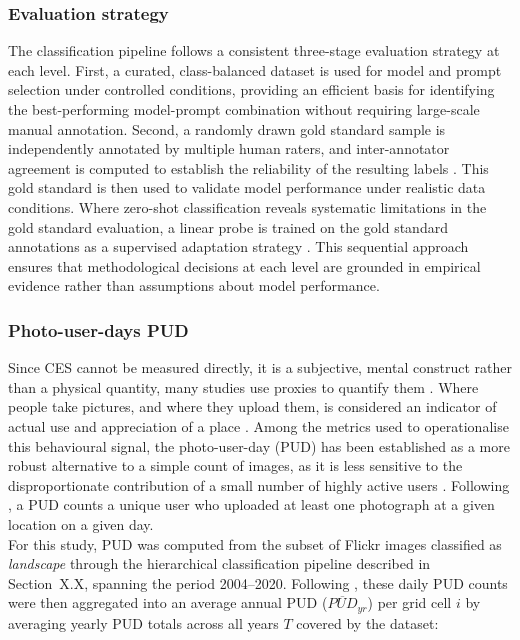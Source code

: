 \documentclass[hidelinks, 11pt]{article}
\begin{document}
\subsubsection{Evaluation strategy}
The classification pipeline follows a consistent three-stage evaluation strategy at each level. First, a curated, class-balanced dataset is used for model and prompt selection under controlled conditions, providing an efficient basis for identifying the best-performing model-prompt combination without requiring large-scale manual annotation. Second, a randomly drawn gold standard sample is independently annotated by multiple human raters, and inter-annotator agreement is computed to establish the reliability of the resulting labels \citep{artstein_survey_2008}. This gold standard is then used to validate model performance under realistic data conditions. Where zero-shot classification reveals systematic limitations in the gold standard evaluation, a linear probe is trained on the gold standard annotations as a supervised adaptation strategy \citep{radford_learning_2021}. This sequential approach ensures that methodological decisions at each level are grounded in empirical evidence rather than assumptions about model performance.

\subsubsection{Photo-user-days PUD}
Since CES cannot be measured directly, it is a subjective, mental construct rather than a physical quantity, many studies use proxies to quantify them \citep{wood_using_2013,ghermandi_geolocated_2022,liao_mapping_2025}. Where people take pictures, and where they upload them, is considered an indicator of actual use and appreciation of a place
\citep{wood_using_2013,ghermandi_geolocated_2022}. Among the metrics used to operationalise this behavioural signal, the photo-user-day (PUD) has
been established as a more robust alternative to a simple count of images, as it is less sensitive to the disproportionate contribution of a small number of highly active users \citep{wood_using_2013}. Following \citet{wood_using_2013}, a PUD counts a unique user who uploaded at least one photograph at a given location on a given day.
\\
For this study, PUD was computed from the subset of Flickr images
classified as \textit{landscape} through the hierarchical classification
pipeline described in Section~X.X, spanning the period 2004--2020.
Following \citet{liao_mapping_2025}, these daily PUD counts were then
aggregated into an average annual PUD ($\overline{PUD}_{yr}$) per grid
cell $i$ by averaging yearly PUD totals across all years $T$ covered by
the dataset:
\end{document}
